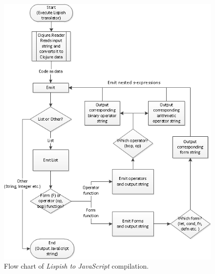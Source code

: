 \begin{figure}[!htbp]
	\centering
	\includegraphics{Graphics/compilation_flow_chart.png}
	\caption[yadayada]
   {Flow chart of \textit{Lispish to JavaScript} compilation.}
  \label{fig:recursive_expansion_flowchart}
\end{figure}